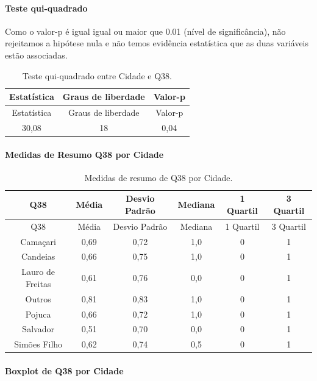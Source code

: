 \documentclass[]{article}
\let\oldparagraph\paragraph
\renewcommand{\paragraph}[1]{\oldparagraph{#1}\mbox{}}
\begin{document}
\hypertarget{teste-qui-quadrado-122}{%
\paragraph{Teste qui-quadrado}\label{teste-qui-quadrado-122}}

Como o valor-p é igual igual ou maior que 0.01 (nível de significância), não rejeitamos a hipótese nula e não temos evidência estatística que as duas variáveis estão associadas.

\begin{longtable}[]{@{}ccc@{}}
\caption{\label{tab:unnamed-chunk-1432}Teste qui-quadrado entre Cidade e Q38.}\tabularnewline
\toprule
Estatística & Graus de liberdade & Valor-p\tabularnewline
\midrule
\endfirsthead
\toprule
Estatística & Graus de liberdade & Valor-p\tabularnewline
\midrule
\endhead
30,08 & 18 & 0,04\tabularnewline
\bottomrule
\end{longtable}

\cleardoublepage

\hypertarget{medidas-de-resumo-q38-por-cidade}{%
\paragraph{Medidas de Resumo Q38 por Cidade}\label{medidas-de-resumo-q38-por-cidade}}

\begin{longtable}[]{@{}cccccc@{}}
\caption{\label{tab:unnamed-chunk-1433}Medidas de resumo de Q38 por Cidade.}\tabularnewline
\toprule
Q38 & Média & Desvio Padrão & Mediana & 1 Quartil & 3 Quartil\tabularnewline
\midrule
\endfirsthead
\toprule
Q38 & Média & Desvio Padrão & Mediana & 1 Quartil & 3 Quartil\tabularnewline
\midrule
\endhead
Camaçari & 0,69 & 0,72 & 1,0 & 0 & 1\tabularnewline
Candeias & 0,66 & 0,75 & 1,0 & 0 & 1\tabularnewline
Lauro de Freitas & 0,61 & 0,76 & 0,0 & 0 & 1\tabularnewline
Outros & 0,81 & 0,83 & 1,0 & 0 & 1\tabularnewline
Pojuca & 0,66 & 0,72 & 1,0 & 0 & 1\tabularnewline
Salvador & 0,51 & 0,70 & 0,0 & 0 & 1\tabularnewline
Simões Filho & 0,62 & 0,74 & 0,5 & 0 & 1\tabularnewline
\bottomrule
\end{longtable}

\hypertarget{boxplot-de-q38-por-cidade}{%
\paragraph{Boxplot de Q38 por Cidade}\label{boxplot-de-q38-por-cidade}}
\end{document}
